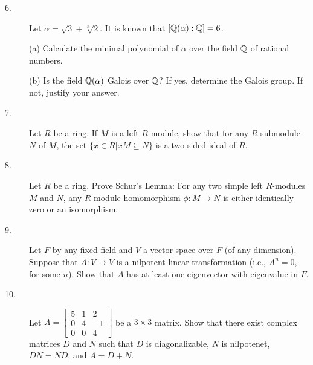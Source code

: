 \documentclass{article}
\begin{document}
\begin{description}
\item[6.]
Let $\alpha = \sqrt{3} + \sqrt[3]{2}$.
It is known that
$[\Bbb Q (\alpha) : \Bbb Q] = 6$.

\item[\quad] (a)
Calculate the minimal polynomial of $\alpha$ over the field $\Bbb Q$ of
rational numbers.

\item[\quad] (b)
Is the field $\Bbb Q(\alpha)$ Galois over $\Bbb Q$? If yes, determine the
Galois group. If not, justify your answer.

\item[7.]
Let $R$ be a ring. If $M$ is a left $R$-module, show that for any
$R$-submodule $N$ of $M$, the set $\{x \in R |x M \subseteq N \}$ is a
two-sided ideal of $R$.

\item[8.]
Let $R$ be a ring. Prove Schur's Lemma: For any two simple left
$R$-modules $M$ and $N$, any $R$-module homomorphism $\phi: M \to N$
is either identically zero or an isomorphism.

\item[9.]
Let $F$ by any fixed field and $V$ a vector space over $F$ (of any dimension).
Suppose that $A:V \to V$ is a nilpotent linear transformation
(i.e., $A^n = 0$, for some $n$). Show that $A$ has at least
one eigenvector with eigenvalue in $F$.

\item[10.]
Let
$A= \begin{bmatrix}
        5&1&2 \\
        0&4&-1 \\
        0&0&4
        \end{bmatrix}$
be a $3 \times 3$ matrix. Show that there exist complex matrices $D$ and $N$
such that $D$ is diagonalizable, $N$ is nilpotenet, $DN=ND$, and $A=D+N$.





\end{description}    
\end{document}

